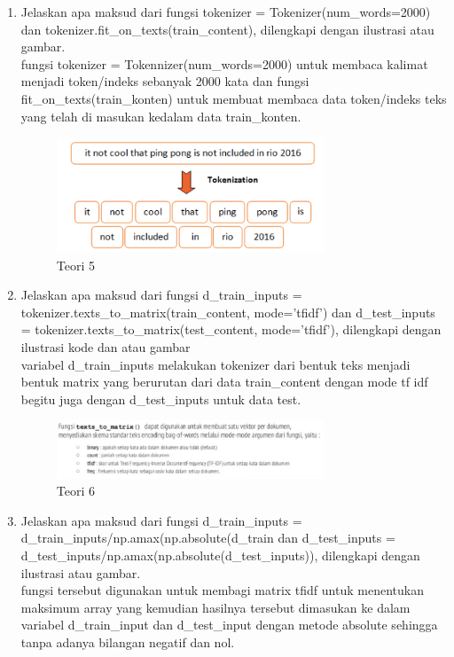 \begin{enumerate}
\item Jelaskan apa maksud dari fungsi tokenizer = Tokenizer(num\_words=2000) dan tokenizer.ﬁt\_on\_texts(train\_content), dilengkapi dengan ilustrasi atau gambar.
	\hfill\\
fungsi tokenizer = Tokennizer(num\_words=2000) untuk membaca kalimat menjadi token/indeks sebanyak 2000 kata dan fungsi fit\_on\_texts(train\_konten) untuk membuat membaca data token/indeks teks yang telah di masukan kedalam data train\_konten.

\begin{figure}[H]
    \includegraphics[width=8cm]{figures/1174084/7/teori5.png}
    \centering
    \caption{Teori 5}
\end{figure}

\item Jelaskan apa maksud dari fungsi d\_train\_inputs = tokenizer.texts\_to\_matrix(train\_content, mode=’tﬁdf’) dan d\_test\_inputs = tokenizer.texts\_to\_matrix(test\_content, mode=’tﬁdf’), dilengkapi dengan ilustrasi kode dan atau gambar
	\hfill\\
	variabel d\_train\_inputs melakukan tokenizer dari bentuk teks menjadi bentuk matrix yang berurutan dari data train\_content dengan mode tf idf begitu juga dengan d\_test\_inputs untuk data test.
	
\begin{figure}[H]
    \includegraphics[width=8cm]{figures/1174084/7/teori6.png}
    \centering
    \caption{Teori 6}
\end{figure}

\item Jelaskan apa maksud dari fungsi d\_train\_inputs = d\_train\_inputs/np.amax(np.absolute(d\_train dan d\_test\_inputs = d\_test\_inputs/np.amax(np.absolute(d\_test\_inputs)), dilengkapi dengan ilustrasi atau gambar.
	\hfill\\
	fungsi tersebut digunakan untuk membagi matrix tfidf untuk menentukan maksimum array yang kemudian hasilnya tersebut dimasukan ke dalam variabel d\_train\_input dan d\_test\_input dengan metode absolute sehingga tanpa adanya bilangan negatif dan nol.
		

\end{enumerate}
